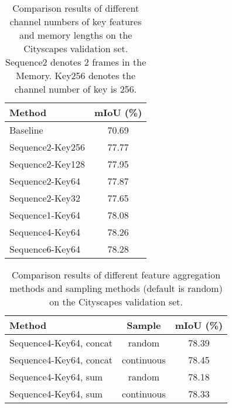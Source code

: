 \documentclass{article}
\begin{document}
	\begin{table}
\caption{Comparison results of different channel numbers of key features and memory lengths on the Cityscapes validation set. Sequence2 denotes 2 frames in the Memory. Key256 denotes the channel number of key is 256.}
		\vspace{-0.3cm}
		\begin{center}
			\begin{tabular}{l | c }
				\hline
				Method & mIoU (\%) \\
				\hline\hline
				Baseline & 70.69 \\
				\hline
				Sequence2-Key256 & 77.77 \\
				Sequence2-Key128 & 77.95 \\
				Sequence2-Key64 & 77.87 \\
				Sequence2-Key32 & 77.65 \\
				\hline
				Sequence1-Key64 & 78.08 \\ 
				Sequence4-Key64 & 78.26 \\ 
				Sequence6-Key64 & 78.28 \\
				\hline
			\end{tabular}
		\end{center}
		\vspace{-0.5cm}
		\label{ablation 01}
	\end{table}
	
	\begin{table}[t]
		\vspace{-0.3cm}
		\caption{Comparison results of different feature aggregation methods and sampling methods (default is random) on the Cityscapes validation set.}
		\vspace{-0.3cm}
		\begin{center}
			\begin{tabular}{l | c | c}
				\hline
				Method & Sample & mIoU (\%) \\
				\hline\hline
				Sequence4-Key64, concat & random & 78.39 \\
				Sequence4-Key64, concat & continuous & 78.45 \\
				Sequence4-Key64, sum & random & 78.18 \\
				Sequence4-Key64, sum & continuous & 78.33 \\
				\hline
			\end{tabular}
		\end{center}
		\vspace{-0.5cm}
		\label{ablation 03}
	\end{table}
	
\end{document}
